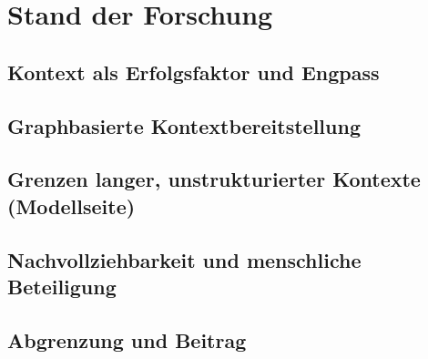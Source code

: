 
\chapter{Stand der Forschung}
\label{chap:forschungsstand}

\section{Kontext als Erfolgsfaktor und Engpass}%
\label{sec:kontext-engpass}

\section{Graphbasierte Kontextbereitstellung}%
\label{sec:graphbasiert}

\section{Grenzen langer, unstrukturierter Kontexte (Modellseite)}%
\label{sec:grenzen-kontexte}

\section{Nachvollziehbarkeit und menschliche Beteiligung}%
\label{sec:nachvollziehbarkeit}

\section{Abgrenzung und Beitrag}%
\label{sec:abgrenzung}
